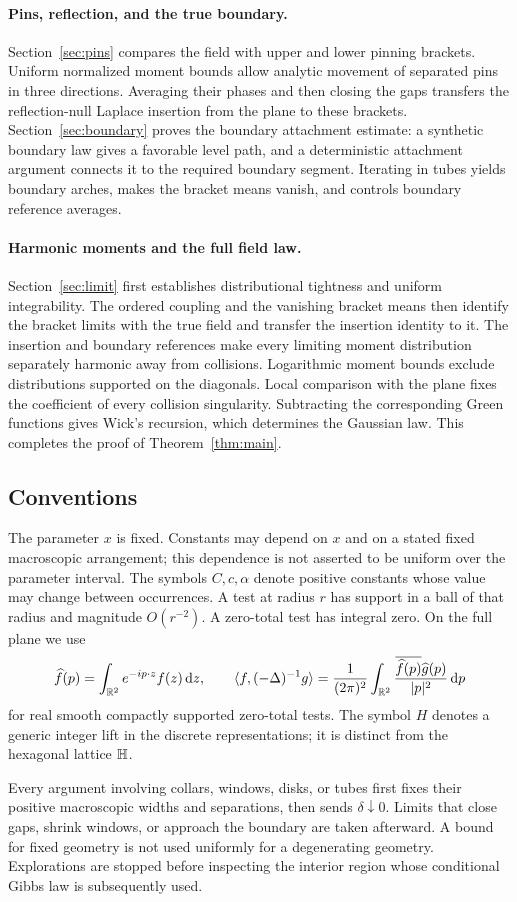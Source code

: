 \paragraph{Pins, reflection, and the true boundary.}
Section~\ref{sec:pins} compares the field with upper and lower pinning
brackets.  Uniform normalized moment bounds allow analytic movement of
separated pins in three directions.  Averaging their phases and then
closing the gaps transfers the reflection-null Laplace insertion from
the plane to these brackets.  Section~\ref{sec:boundary} proves the
boundary attachment estimate: a synthetic boundary law gives a favorable
level path, and a deterministic attachment argument connects it to the
required boundary segment.  Iterating in tubes yields boundary arches,
makes the bracket means vanish, and controls boundary reference averages.

\paragraph{Harmonic moments and the full field law.}
Section~\ref{sec:limit} first establishes distributional tightness and
uniform integrability.  The ordered coupling and the vanishing bracket
means then identify the bracket limits with the true field and transfer
the insertion identity to it.  The insertion and boundary references
make every limiting moment distribution separately harmonic away from
collisions.  Logarithmic moment bounds exclude distributions supported
on the diagonals.  Local comparison with the plane fixes the coefficient
of every collision singularity.  Subtracting the corresponding Green
functions gives Wick's recursion, which determines the Gaussian law.
This completes the proof of Theorem~\ref{thm:main}.

\subsection{Conventions}

The parameter $x$ is fixed.  Constants may depend on $x$ and on a stated
fixed macroscopic arrangement; this dependence is not asserted to be
uniform over the parameter interval.  The symbols $C,c,\alpha$ denote
positive constants whose value may change between occurrences.  A test
at radius $r$ has support in a ball of that radius and magnitude
$O(r^{-2})$.  A zero-total test has integral zero.  On the full plane we
use
\[
 \widehat f(p)=\int_{\mathbb R^2}e^{-ip\cdot z}f(z)\,\mathrm d z,
 \qquad
 \langle f,(-\Delta)^{-1}g\rangle
 =\frac1{(2\pi)^2}\int_{\mathbb R^2}
       \frac{\overline{\widehat f(p)}\widehat g(p)}{|p|^2}\,\mathrm d p
\]
for real smooth compactly supported zero-total tests.  The symbol $H$
denotes a generic integer lift in the discrete representations; it is
distinct from the hexagonal lattice $\mathbb H$.

Every argument involving collars, windows, disks, or tubes first fixes
their positive macroscopic widths and separations, then sends
$\delta\downarrow0$.  Limits that close gaps, shrink windows, or approach
the boundary are taken afterward.  A bound for fixed geometry is not
used uniformly for a degenerating geometry.  Explorations are stopped
before inspecting the interior region whose conditional Gibbs law is
subsequently used.
